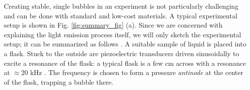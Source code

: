 \documentclass[11pt,prb,aps,nofootinbib,superscriptaddress,floatfix]{revtex4-2}
\begin{document}

Creating stable, single bubbles in an experiment is not particularly challenging and can be done with standard and low-cost materials. A typical experimental setup is shown in Fig. \ref{fig:summary_fig} (a). Since we are concerned with explaining the light emission process itself, we will only sketch the experimental setup; it can be summarized as follows \cite{lentz1995mie,gaitan1990experimental,gaitan1992sonoluminescence,gompf2000mie,brenner2002single,yasui2018acoustic,brennen2014cavitation,suslick2008inside}. A suitable sample of liquid is placed into a flask. Stuck to the outside are piezoelectric transducers driven sinusoidally to excite a resonance of the flask: a typical flask is a few cm across with a resonance at $\approx 20$ kHz \cite{brenner2002single}. The frequency is chosen to form a pressure \emph{antinode} at the center of the flask, trapping a bubble there.

\end{document}

